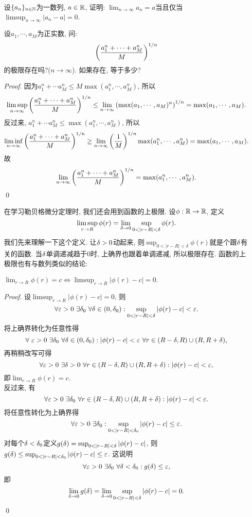 \begin{exercise}
    设$\{a_n\}_{n\in \mathbb{N}}$为一数列, $a \in \mathbb{R}$, 证明: 
    $\lim_{n \to \infty}a_n = a$当且仅当$\limsup_{n\to \infty}|a_n-a|=0$.
\end{exercise}
\begin{exercise}
    设$a_1, \cdots, a_M$为正实数, 问:
    $$\left(\frac{a_1^n + \cdots + a_M^n}{M}\right)^{1/n}$$
    的极限存在吗?($n \to \infty$). 如果存在, 等于多少?
\end{exercise}
\begin{proof}
    因为$a_1^n + \cdots a_M^n \leq M \max (a_1^n, \cdots, a_M^n)$,
    所以
    $$\limsup_{n \to \infty}\left(\frac{a_1^n + \cdots + a_M^n}{M}\right)^{1/n}
    \leq \lim_{n \to \infty}\left(\max (a_1, \cdots, a_M)^n\right)^{1/n} = \max (a_1, \cdots, a_M). $$
    反过来, $a_1^n + \cdots a_M^n \leq \max (a_1^n, \cdots, a_M^n)$, 所以
    $$\liminf_{n \to \infty}\left(\frac{a_1^n + \cdots + a_M^n}{M}\right)^{1/n}
    \geq \lim_{n \to \infty}\left(\frac{1}{M}\right)^{1/n} \max (a_1^n, \cdots, a_M^n) =
    \max (a_1, \cdots, a_M). $$
    故$$\lim_{n \to \infty}\left(\frac{a_1^n + \cdots + a_M^n}{M}\right)^{1/n}
    = \max (a_1^n, \cdots, a_M^n). $$ \qed
\end{proof}
在学习勒贝格微分定理时, 我们还会用到函数的上极限. 设$\phi:\mathbb{R} \to \mathbb{R}$, 定义
$$\limsup_{r \to R} \phi(r) = \lim_{\d \to 0} \sup_{0<|r-R|<\delta} \phi(r). $$
我们先来理解一下这个定义. 让$\delta>0$动起来, 则$\sup_{0<|r-R|<\delta}\phi(r)$就是个跟$\delta$有关的函数. 当$\delta$单调递减趋于$0$时, 上确界也跟着单调递减, 所以极限存在. 
函数的上极限也有与数列类似的结论:
\begin{example}
    $\lim_{r \to R}\phi(r) = c \iff \limsup_{r \to R} |\phi(r) - c| = 0$.
\end{example}
\begin{proof}
    设$\limsup_{r \to R} |\phi(r) - c| = 0$, 则
    $$\forall \eps > 0 ~\exists \delta_0 ~\forall \d \in (0, \d_0): 
    \sup_{0<|r-R|<\d}|\phi(r)-c| < \eps. $$
    将上确界转化为任意性得
    $$\forall ~\varepsilon > 0 ~\exists \delta_0 ~\forall \delta \in (0, \delta_0): 
    |\phi(r)-c| < \varepsilon~\forall r \in (R-\delta, R) \cup (R, R+\delta), $$
    再稍稍改写可得
    $$\forall \varepsilon > 0 ~\exists \delta>0 ~\forall r \in (R-\delta, R) \cup (R, R+\delta):
    |\phi(r)-c| < \varepsilon, $$
    即$\lim_{r \to R}\phi(r) = c$. \\
    反过来, 有$$\forall \varepsilon > 0~\exists \delta_0~\forall r \in (R-\delta,R) \cup (R,R+\delta): |\phi(r)-c| < \varepsilon. $$
    将任意性转化为上确界得
    $$\forall \eps > 0~\exists \d_0: \sup_{0<|r-R|<\d_0} |\phi(r)-c| \leq \eps.$$
    对每个$\delta<\delta_0$定义$g(\d) = \sup_{0<|r-R|<\d} |\phi(r)-c|$, 则
    $g(\d) \leq \sup_{0<|r-R|<\d_0} |\phi(r)-c| \leq \eps$. 这说明
    $$\forall \varepsilon > 0 ~\exists \delta_0 ~\forall \delta<\delta_0: g(\delta) \leq \varepsilon, $$
    即
    $$\lim_{\d \to 0} g(\d) = \lim_{\d \to 0}\sup_{0<|r-R|<\d} |\phi(r)-c|=0. $$
    \qed 
\end{proof}
